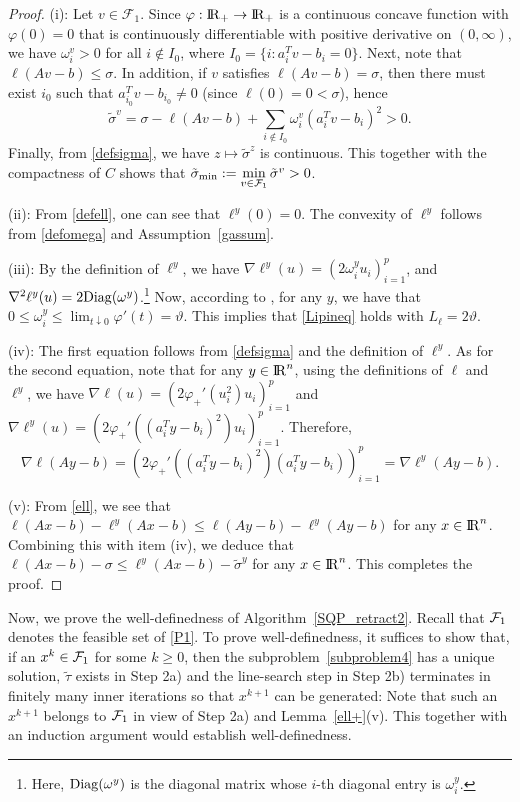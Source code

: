 \documentclass[10pt]{article}
\numberwithin{equation}{section}
\def\R{{\rm I\!R}}
\def\Diag{{\rm Diag}}
\def\sigmamin{{\rm\tilde{\sigma}_{min}}}
\begin{document}
\begin{proof}
(i): Let $v \in \mathcal{F}_1$. Since $\varphi:\R_+\to \R_+$ is a continuous concave function with $\varphi(0) = 0$ that is continuously differentiable with positive derivative on $(0, \infty)$, we have $\omega_i^v > 0$ for all $i \notin I_0$, where $I_0=\{i: a_i^Tv-b_i=0\}$. Next, note that $\ell(Av - b) \leq \sigma$. In addition, if $v$ satisfies $\ell(Av - b) = \sigma$, then there must exist $i_0$ such that $a_{i_0}^Tv - b_{i_0} \not= 0$ (since $\ell(0) = 0 < \sigma$), hence
\[
\tilde{\sigma}^v = \sigma - \ell(Av - b) + \sum_{ i \notin I_{0}} \omega_i^v(a_i^Tv - b_i)^2 > 0.
 \]
Finally, from \eqref{defsigma}, we have $z\mapsto \tilde{\sigma}^z$ is continuous. This together with the compactness of $C$ shows that $\sigmamin:= \min\limits_{v\in \mathcal{F}_1}\tilde{\sigma}^v > 0$.

(ii): From \eqref{defell}, one can see that $\ell^y(0) = 0$. The convexity of $\ell^y$ follows from \eqref{defomega} and Assumption~\ref{gassum}.

(iii): By the definition of $\ell^y$, we have $\nabla \ell^y (u) = (2\omega_i^yu_i)_{i=1}^p$, and $\nabla^2\ell^y (u) = 2\Diag(\omega^y)$.\footnote{Here, $\Diag(\omega^y)$ is the diagonal matrix whose $i$-th diagonal entry is $\omega^y_i$.} Now, according to \cite[Lemma~2.2]{YuPo19}, for any $y$, we have that $0\le\omega_i^y\leq \lim_{t\downarrow 0}\varphi'(t)=\vartheta$. This implies that \eqref{Lipineq} holds with $L_{\ell} = 2\vartheta$.

(iv): The first equation follows from \eqref{defsigma} and the definition of $\ell^y$. As for the second equation, note that for any $y\in\R^n$, using the definitions of $\ell$ and $\ell^y$, we have $\nabla\ell(u) = \left(2\varphi_+'(u_i^2)u_i\right)_{i=1}^p$ and $\nabla\ell^y(u) = \left(2\varphi_+'((a_i^Ty - b_i)^2)u_i\right)_{i=1}^p$. Therefore,
\[
 \nabla\ell(Ay - b) = \left(2\varphi_+'((a_i^Ty - b_i)^2)(a_i^Ty - b_i)\right)_{i=1}^p = \nabla\ell^y(Ay - b).
\]

(v): From \eqref{ell}, we see that $\ell(Ax - b) - \ell^y(Ax - b) \leq \ell(Ay - b) - \ell^y(Ay - b)$ for any $x\in \R^n$. Combining this with item (iv), we deduce that $\ell(Ax - b) - \sigma \leq \ell^y(Ax - b) - \tilde{\sigma}^y$ for any $x\in \R^n$. This completes the proof.
\end{proof}

Now, we prove the well-definedness of Algorithm~\ref{SQP_retract2}. Recall that ${\cal F}_1$ denotes the feasible set of \eqref{P1}. To prove well-definedness, it suffices to show that, if an $x^k\in {\cal F}_1$  for some $k\ge 0$, then the subproblem~\eqref{subproblem4} has a unique solution, $\widetilde\tau$ exists in Step 2a) and the line-search step in Step 2b) terminates in finitely many inner iterations so that $x^{k+1}$ can be generated: Note that such an $x^{k+1}$ belongs to ${\cal F}_1$ in view of Step 2a) and Lemma~\ref{ell+}(v). This together with an induction argument would establish well-definedness.
\end{document}
